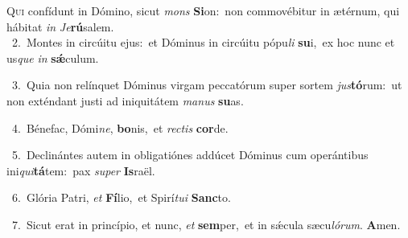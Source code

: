\lettrine{\initial\textcolor{\initialcolor}{Q}}{ui} confídunt in Dómino, sicut \textit{mons} \textbf{Si}\-on:~\star non commovébitur in ætérnum, qui hábitat \textit{in} \textit{Je}\-\textbf{rú}salem.\\
{\numbfont\textcolor{\numbcolor}{~2.}}~Montes in circúitu ejus:~\dagger et Dóminus in circúitu pópu\textit{li} \textbf{su}\-i,~\star ex hoc nunc et us\textit{que} \textit{in} \textbf{sǽ}\-culum.\par
{\numbfont\textcolor{\numbcolor}{~3.}}~Quia non relínquet Dóminus virgam peccatórum super sortem \textit{jus}\-\textbf{tó}rum:~\star ut non exténdant justi ad iniquitátem \textit{ma}\-\textit{nus} \textbf{su}\-as.\par
{\numbfont\textcolor{\numbcolor}{~4.}}~Bénefac, Dómi\-\textit{ne}\-, \textbf{bo}\-nis,~\star et \textit{rec}\-\textit{tis} \textbf{cor}\-de.\par
{\numbfont\textcolor{\numbcolor}{~5.}}~Declinántes autem in obligatiónes addúcet Dóminus cum operántibus ini\-\textit{qui}\-\textbf{tá}tem:~\star pax \textit{su}\-\textit{per} \textbf{Is}\-raël.\par
{\numbfont\textcolor{\numbcolor}{~6.}}~Glória Patri, \textit{et} \textbf{Fí}\-lio,~\star et Spirí\-\textit{tu}\-\textit{i} \textbf{Sanc}\-to.\par
{\numbfont\textcolor{\numbcolor}{~7.}}~Sicut erat in princípio, et nunc, \textit{et} \textbf{sem}\-per,~\star et in sǽcula sæcu\-\textit{ló}\-\textit{rum}. \textbf{A}\-men.\par
